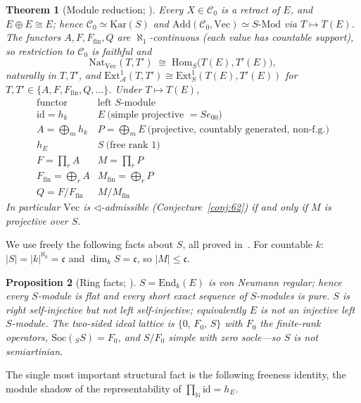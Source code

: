 \documentclass[11pt,reqno]{amsart}
\theoremstyle{plain}
\newtheorem{theorem}{Theorem}[section]
\newtheorem{proposition}[theorem]{Proposition}
\theoremstyle{definition}
\theoremstyle{remark}
\renewcommand{\Vec}{\mathrm{Vec}}
\newcommand{\Add}{\mathrm{Add}}
\newcommand{\End}{\mathrm{End}}
\newcommand{\Hom}{\mathrm{Hom}}
\newcommand{\Ext}{\mathrm{Ext}}
\newcommand{\Nat}{\mathrm{Nat}}
\newcommand{\Mod}{\text{-}\mathrm{Mod}}
\newcommand{\Kar}{\mathrm{Kar}}
\newcommand{\Soc}{\mathrm{Soc}}
\newcommand{\tri}{\triangleleft}
\newcommand{\C}{\mathcal{C}}
\newcommand{\A}{\mathcal{A}}
\newcommand{\N}{\mathbb{N}}
\begin{document}
\begin{theorem}[Module reduction; {\cite[Thm.~1--2]{macbeth-reduction}}]\label{thm:reduction}
Every $X\in\C_0$ is a retract of $E$, and $E\oplus E\cong E$; hence $\C_0\simeq\Kar(S)$ and $\Add(\C_0,\Vec)\simeq S\Mod$ via $T\mapsto T(E)$. The functors $A,F,F_{\mathrm{fin}},Q$ are $\aleph_1$-continuous (each value has countable support), so restriction to $\C_0$ is faithful and
\[
  \Nat_{\Vec}(T,T')\;\cong\;\Hom_S\bigl(T(E),T'(E)\bigr),
\]
naturally in $T,T'$, and $\Ext^1_{\A}(T,T')\cong\Ext^1_S(T(E),T'(E))$ for $T,T'\in\{A,F,F_{\mathrm{fin}},Q,\dots\}$. Under $T\mapsto T(E)$,
\[
\begin{array}{c|c}
  \text{functor} & \text{left $S$-module}\\\hline
  \mathrm{id}=h_k & E\ \text{(simple projective $=Se_{00}$)}\\
  A=\bigoplus_m h_k & P=\bigoplus_m E\ \text{(projective, countably generated, non-f.g.)}\\
  h_E & S\ \text{(free rank $1$)}\\
  F=\prod_r A & M=\prod_r P\\
  F_{\mathrm{fin}}=\bigoplus_r A & M_{\mathrm{fin}}=\bigoplus_r P\\
  Q=F/F_{\mathrm{fin}} & M/M_{\mathrm{fin}}
\end{array}
\]
In particular $\Vec$ is $\tri$-admissible (Conjecture~\ref{conj:62}) if and only if $M$ is projective over $S$.
\end{theorem}

We use freely the following facts about $S$, all proved in~\cite[\S2--3]{macbeth-reduction}. For countable $k$: $|S|=|k|^{\aleph_0}=\mathfrak c$ and $\dim_k S=\mathfrak c$, so $|M|\le\mathfrak c$.

\begin{proposition}[Ring facts; {\cite[Thm.~3]{macbeth-reduction}}]\label{prop:ring}
$S=\End_k(E)$ is von Neumann regular; hence every $S$-module is flat and every short exact sequence of $S$-modules is pure. $S$ is right self-injective but \emph{not} left self-injective; equivalently $E$ is not an injective left $S$-module. The two-sided ideal lattice is $\{0,\,F_0,\,S\}$ with $F_0$ the finite-rank operators, $\Soc({}_SS)=F_0$, and $S/F_0$ simple with zero socle---so $S$ is \emph{not} semiartinian.
\end{proposition}

The single most important structural fact is the following freeness identity, the module shadow of the representability of $\prod_{\N}\mathrm{id}=h_E$.
\end{document}
